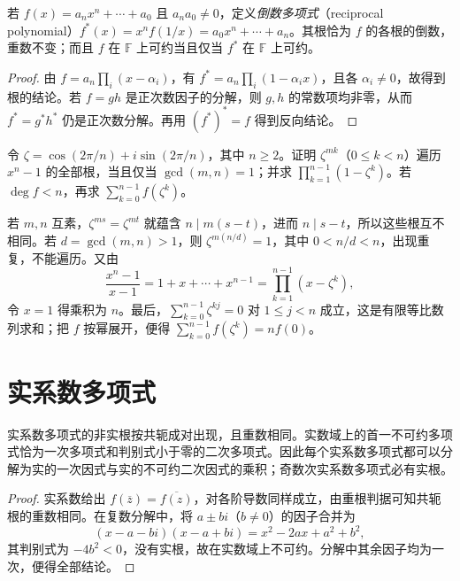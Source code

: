 \begin{proposition}[倒数多项式]
\label{prop:poly-reciprocal}
若 $f(x)=a_nx^n+\cdots+a_0$ 且 $a_na_0\ne0$，定义\emph{倒数多项式}（reciprocal polynomial）$f^*(x)=x^nf(1/x)=a_0x^n+\cdots+a_n$。其根恰为 $f$ 的各根的倒数，重数不变；而且 $f$ 在 $\mathbb F$ 上可约当且仅当 $f^*$ 在 $\mathbb F$ 上可约。
\end{proposition}
\begin{proof}
由 $f=a_n\prod_i(x-\alpha_i)$，有 $f^*=a_n\prod_i(1-\alpha_ix)$，且各 $\alpha_i\ne0$，故得到根的结论。若 $f=gh$ 是正次数因子的分解，则 $g,h$ 的常数项均非零，从而 $f^*=g^*h^*$ 仍是正次数分解。再用 $(f^*)^*=f$ 得到反向结论。
\end{proof}

\begin{example}
\label{ex:poly-unity-roots}
令 $\zeta=\cos(2\pi/n)+i\sin(2\pi/n)$，其中 $n\geq2$。证明 $\zeta^{mk}$（$0\leq k<n$）遍历 $x^n-1$ 的全部根，当且仅当 $\gcd(m,n)=1$；并求 $\prod_{k=1}^{n-1}(1-\zeta^k)$。若 $\deg f<n$，再求 $\sum_{k=0}^{n-1}f(\zeta^k)$。
\end{example}
\begin{solve}
若 $m,n$ 互素，$\zeta^{ms}=\zeta^{mt}$ 就蕴含 $n\mid m(s-t)$，进而 $n\mid s-t$，所以这些根互不相同。若 $d=\gcd(m,n)>1$，则 $\zeta^{m(n/d)}=1$，其中 $0<n/d<n$，出现重复，不能遍历。又由
\[
    \frac{x^n-1}{x-1}=1+x+\cdots+x^{n-1}
    =\prod_{k=1}^{n-1}(x-\zeta^k),
\]
令 $x=1$ 得乘积为 $n$。最后，$\sum_{k=0}^{n-1}\zeta^{kj}=0$ 对 $1\leq j<n$ 成立，这是有限等比数列求和；把 $f$ 按幂展开，便得 $\sum_{k=0}^{n-1}f(\zeta^k)=nf(0)$。
\end{solve}

\section{实系数多项式}
\label{sec:poly-real}

\begin{theorem}
\label{thm:poly-real-factorization}
实系数多项式的非实根按共轭成对出现，且重数相同。实数域上的首一不可约多项式恰为一次多项式和判别式小于零的二次多项式。因此每个实系数多项式都可以分解为实的一次因式与实的不可约二次因式的乘积；奇数次实系数多项式必有实根。
\end{theorem}
\begin{proof}
实系数给出 $f(\overline z)=\overline{f(z)}$，对各阶导数同样成立，由重根判据可知共轭根的重数相同。在复数分解中，将 $a\pm bi$（$b\ne0$）的因子合并为
\[
    (x-a-bi)(x-a+bi)=x^2-2ax+a^2+b^2,
\]
其判别式为 $-4b^2<0$，没有实根，故在实数域上不可约。分解中其余因子均为一次，便得全部结论。
\end{proof}

